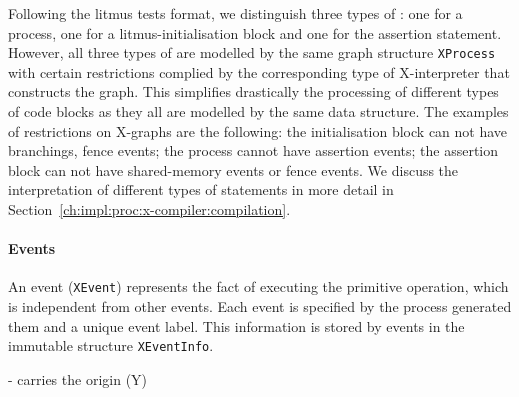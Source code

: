 Following the litmus tests format, we distinguish three types of \xgraph{}: one for a process, one for a litmus-initialisation block and one for the assertion statement.
However, all three types of \xgraph{} are modelled by the same graph structure \texttt{XProcess} with certain restrictions complied by the corresponding type of X-interpreter that constructs the graph. %
This simplifies drastically the processing of different types of code blocks as they all are modelled by the same data structure.
The examples of restrictions on X-graphs are the following: the initialisation block can not have branchings, fence events; the process cannot have assertion events; the assertion block can not have shared-memory events or fence events.
We discuss the interpretation of different types of statements in more detail in Section~\ref{ch:impl:proc:x-compiler:compilation}.


\paragraph{Events}
\label{ch:impl:model:xgraph:evt}

An event (\texttt{XEvent}) represents the fact of executing the primitive operation, which is independent from other events.
Each event is specified by the process generated them and a unique event label.
This information is stored by events in the immutable structure \texttt{XEventInfo}.

- carries the origin (Y)

